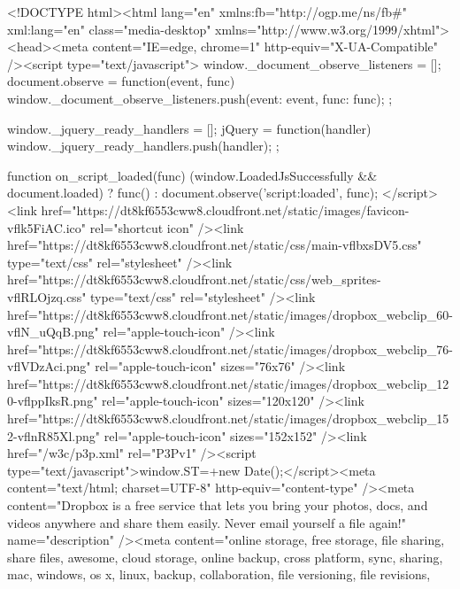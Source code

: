 <!DOCTYPE html><html lang="en" xmlns:fb="http://ogp.me/ns/fb#" xml:lang="en" class="media-desktop" xmlns="http://www.w3.org/1999/xhtml"><head><meta content="IE=edge, chrome=1" http-equiv="X-UA-Compatible" /><script type="text/javascript">
                window._document_observe_listeners = [];
                document.observe = function(event, func) {
                    window._document_observe_listeners.push({event: event, func: func});
                };

                window._jquery_ready_handlers = [];
                jQuery = function(handler) {
                    window._jquery_ready_handlers.push(handler);
                };

                function on_script_loaded(func) {
                    (window.LoadedJsSuccessfully && document.loaded) ? func() : document.observe('script:loaded', func);
                }
                </script> <link href="https://dt8kf6553cww8.cloudfront.net/static/images/favicon-vflk5FiAC.ico" rel="shortcut icon" /><link href="https://dt8kf6553cww8.cloudfront.net/static/css/main-vflbxsDV5.css" type="text/css" rel="stylesheet" /><link href="https://dt8kf6553cww8.cloudfront.net/static/css/web_sprites-vflRLOjzq.css" type="text/css" rel="stylesheet" /><link href="https://dt8kf6553cww8.cloudfront.net/static/images/dropbox_webclip_60-vflN_uQqB.png" rel="apple-touch-icon" /><link href="https://dt8kf6553cww8.cloudfront.net/static/images/dropbox_webclip_76-vflVDzAci.png" rel="apple-touch-icon" sizes="76x76" /><link href="https://dt8kf6553cww8.cloudfront.net/static/images/dropbox_webclip_120-vflppIksR.png" rel="apple-touch-icon" sizes="120x120" /><link href="https://dt8kf6553cww8.cloudfront.net/static/images/dropbox_webclip_152-vflnR85Xl.png" rel="apple-touch-icon" sizes="152x152" /><link href="/w3c/p3p.xml" rel="P3Pv1" /><script type="text/javascript">window.ST=+new Date();</script><meta content="text/html; charset=UTF-8" http-equiv="content-type" /><meta content="Dropbox is a free service that lets you bring your photos, docs, and videos anywhere and share them easily. Never email yourself a file again!" name="description" /><meta content="online storage, free storage, file sharing, share files,
    awesome, cloud storage, online backup, cross platform, sync, sharing, mac,
    windows, os x, linux, backup, collaboration, file versioning, file revisions,
